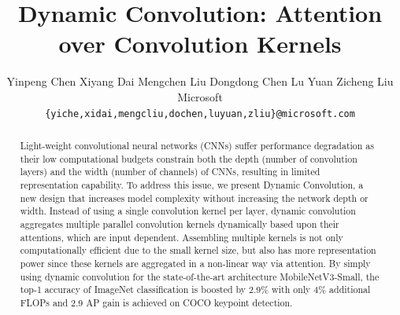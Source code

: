 \documentclass[10pt,twocolumn,letterpaper]{article}
\begin{document}
\title{Dynamic Convolution: Attention over Convolution Kernels}

\author{{Yinpeng Chen \qquad Xiyang Dai \qquad Mengchen Liu \qquad Dongdong Chen \qquad Lu Yuan \qquad Zicheng Liu}\\
Microsoft\\
{\tt\small \{yiche,xidai,mengcliu,dochen,luyuan,zliu\}@microsoft.com}
}

\maketitle

\begin{abstract}
Light-weight convolutional neural networks (CNNs) suffer performance degradation as their low computational budgets constrain both the depth (number of convolution layers) and the width (number of channels) of CNNs, resulting in limited representation capability. To address this issue, we present Dynamic Convolution, a new design that increases model complexity without increasing the network depth or width. Instead of using a single convolution kernel per layer, dynamic convolution aggregates multiple parallel convolution kernels dynamically based upon their attentions, which are input dependent. Assembling multiple kernels is not only computationally efficient due to the small kernel size, but also has more representation power since these kernels are aggregated in a non-linear way via attention. By simply using dynamic convolution for the state-of-the-art architecture MobileNetV3-Small, the top-1 accuracy of ImageNet classification is boosted by 2.9\% with only 4\% additional FLOPs and 2.9 AP gain is achieved on COCO keypoint detection.
\end{abstract}
\end{document}
